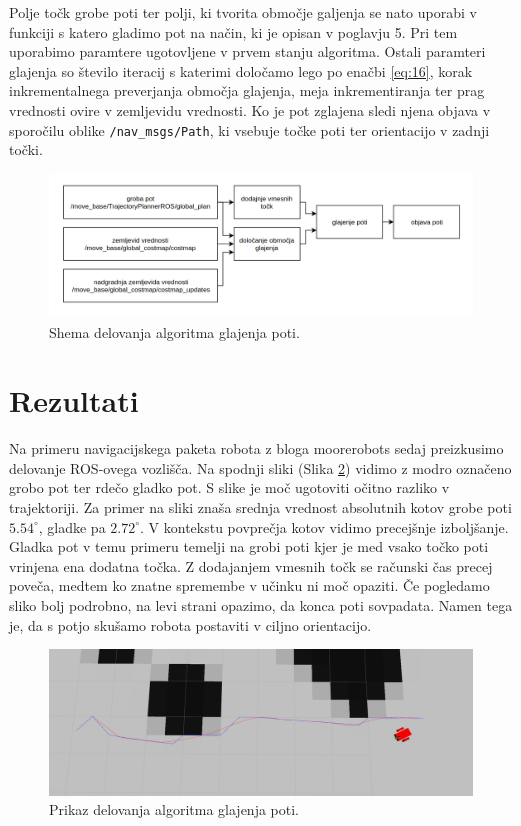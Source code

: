 \documentclass[10pt,a4paper]{article}
\begin{document}
Polje točk grobe poti ter polji, ki tvorita območje galjenja se nato uporabi v funkciji s katero gladimo pot na način, ki je opisan v poglavju 5. Pri tem uporabimo paramtere ugotovljene v prvem stanju algoritma. Ostali paramteri glajenja so število iteracij s katerimi določamo lego po enačbi \ref{eq:16}, korak inkrementalnega preverjanja območja glajenja, meja inkrementiranja ter prag vrednosti ovire v zemljevidu vrednosti. Ko je pot zglajena sledi njena objava v sporočilu oblike \verb|/nav_msgs/Path|, ki vsebuje točke poti ter orientacijo v zadnji točki.

\begin{figure}[H]
	\centering
	\includegraphics[width=16cm]{pic/shema.png}
	\caption{Shema delovanja algoritma glajenja poti.}
	\label{fig:slika6}
\end{figure}

\section{Rezultati}

Na primeru navigacijskega paketa robota z bloga moorerobots \cite{vir10} sedaj preizkusimo delovanje ROS-ovega vozlišča. Na spodnji sliki (Slika \ref{fig:slika7}) vidimo z modro označeno grobo pot ter rdečo gladko pot. S slike je moč ugotoviti očitno razliko v trajektoriji. Za primer na sliki znaša srednja vrednost absolutnih kotov grobe poti $5.54^{\circ} $, gladke pa $2.72^{\circ}$. V kontekstu povprečja kotov vidimo precejšnje izboljšanje. Gladka pot v temu primeru temelji na grobi poti kjer je med vsako točko poti vrinjena ena dodatna točka. Z dodajanjem vmesnih točk se računski čas precej poveča, medtem ko znatne spremembe v učinku ni moč opaziti. Če pogledamo sliko bolj podrobno, na levi strani opazimo, da konca poti sovpadata. Namen tega je, da s potjo skušamo robota postaviti v ciljno orientacijo.

\begin{figure}[H]
	\centering
	\includegraphics[width=16cm]{pic/preizkus_k.png}
	\caption{Prikaz delovanja algoritma glajenja poti.}
	\label{fig:slika7}
\end{figure}
\end{document}
